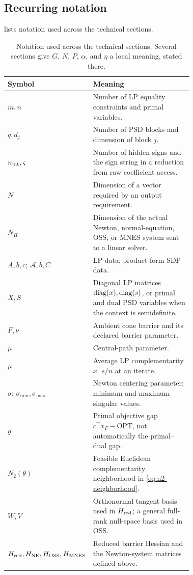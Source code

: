\subsection{Recurring notation}
\label{sec:prelim-notation}

 lists notation used across the technical
sections.

\begin{table}[!htbp]
 \centering
 \small
 \caption{Notation used across the technical sections.  Several sections
 give $G$, $N$, $P$, $\alpha$, and $\eta$ a local meaning, stated
 there.}
 \label{tab:recurring-notation}
 \begin{tabular}{@{}lp{0.72\linewidth}@{}}
  \toprule
  Symbol & Meaning \\
  \midrule
  $m,n$ & Number of LP equality constraints and primal variables. \\
  $q,d_j$ & Number of PSD blocks and dimension of block $j$. \\
  $n_{\rm bit},\varsigma$ & Number of hidden signs and the sign string in a reduction from raw coefficient access. \\
  $N$ & Dimension of a vector required by an output requirement. \\
  $N_H$ & Dimension of the actual Newton, normal-equation, OSS, or MNES system sent to a linear solver. \\
  $A,b,c$; $\mathcal A,b,C$ & LP data; product-form SDP data. \\
  $X,S$ & Diagonal LP matrices $\operatorname{diag}(x),\operatorname{diag}(s)$, or primal and dual PSD variables when the context is semidefinite. \\
  $F,\nu$ & Ambient cone barrier and its declared barrier parameter. \\
  $\mu$ & Central-path parameter. \\
  $\bar\mu$ & Average LP complementarity $x^\top s/n$ at an iterate. \\
  $\sigma$; $\sigma_{\min},\sigma_{\max}$ & Newton centering parameter; minimum and maximum singular values. \\
  $g$ & Primal objective gap $c^\top x_F-\mathrm{OPT}$, not automatically the primal--dual gap. \\
  $N_2(\theta)$ & Feasible Euclidean complementarity neighborhood in \eqref{eq:n2-neighborhood}. \\
  $W,V$ & Orthonormal tangent basis used in $H_{\rm red}$; a general full-rank null-space basis used in OSS. \\
  $H_{\rm red},H_{\rm NE},H_{\rm OSS},H_{\rm MNES}$ & Reduced barrier Hessian and the Newton-system matrices defined above. \\

\end{tabular}
\end{table}
